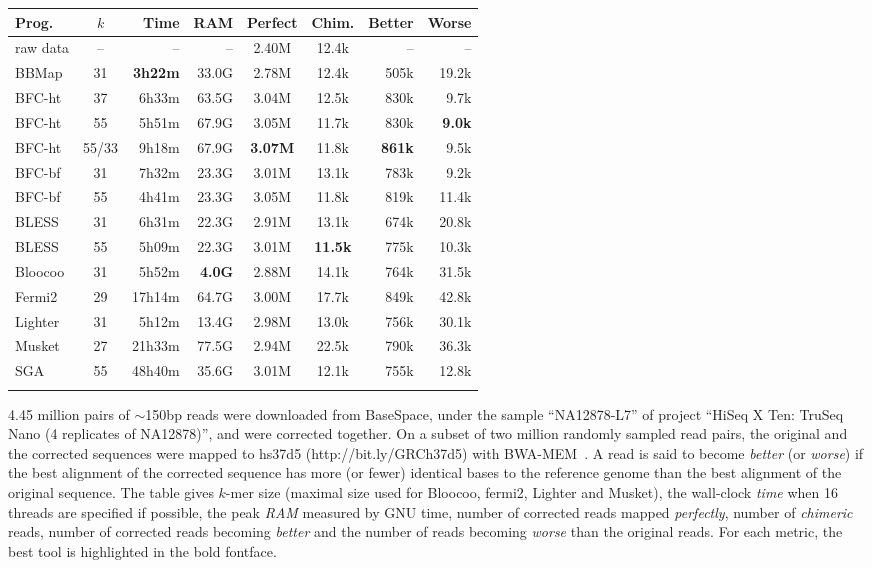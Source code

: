 \documentclass{bioinfo}
\begin{document}
\begin{table}[t]
{\footnotesize
\begin{tabular}{lcrrccrr}
\toprule
Prog.     & $k$ & Time  & RAM   & Perfect&Chim.& Better & Worse \\
\midrule
raw data  & --  & --    & --    & 2.40M  & 12.4k  & --     & -- \\
BBMap     & 31  &{\bf 3h22m}&33.0G& 2.78M& 12.4k  & 505k   & 19.2k \\
BFC-ht    & 37  & 6h33m & 63.5G & 3.04M  & 12.5k  & 830k   & 9.7k \\
BFC-ht    & 55  & 5h51m & 67.9G & 3.05M  &11.7k& 830k   &{\bf 9.0k}\\
BFC-ht    &55/33& 9h18m & 67.9G &{\bf 3.07M}&11.8k&{\bf 861k}&9.5k\\
BFC-bf    & 31  & 7h32m & 23.3G & 3.01M  & 13.1k  & 783k   & 9.2k \\
BFC-bf    & 55  & 4h41m & 23.3G & 3.05M  &11.8k& 819k   & 11.4k \\
BLESS     & 31  & 6h31m & 22.3G & 2.91M  & 13.1k  & 674k   & 20.8k \\
BLESS     & 55  & 5h09m & 22.3G & 3.01M  &{\bf 11.5k}& 775k& 10.3k \\
Bloocoo   & 31  & 5h52m &{\bf 4.0G}&2.88M& 14.1k  & 764k   & 31.5k  \\
Fermi2    & 29  &17h14m & 64.7G & 3.00M  & 17.7k  & 849k   &42.8k \\
Lighter   & 31  & 5h12m & 13.4G & 2.98M  & 13.0k  & 756k   & 30.1k  \\
Musket    & 27  &21h33m & 77.5G & 2.94M  & 22.5k  & 790k   & 36.3k  \\
SGA       & 55  &48h40m & 35.6G & 3.01M  & 12.1k  & 755k   & 12.8k  \\
\botrule
\end{tabular}}{4.45 million pairs of $\sim$150bp reads were downloaded from
BaseSpace, under the sample ``NA12878-L7'' of project ``HiSeq X Ten: TruSeq
Nano (4 replicates of NA12878)'', and were corrected together. On a subset of
two million randomly sampled read pairs, the original and the corrected
sequences were mapped to hs37d5 (http://bit.ly/GRCh37d5) with
BWA-MEM~\citep{Li:2013aa}.  A read is said to become \emph{better} (or
\emph{worse}) if the best alignment of the corrected sequence has more (or
fewer) identical bases to the reference genome than the best alignment of the
original sequence. The table gives $k$-mer size (maximal size used for Bloocoo,
fermi2, Lighter and Musket), the wall-clock \emph{time} when 16 threads are
specified if possible, the peak \emph{RAM} measured by GNU time, number of
corrected reads mapped \emph{perfectly}, number of \emph{chimeric} reads,
number of corrected reads becoming \emph{better} and the number of reads
becoming \emph{worse} than the original reads. For each metric, the best tool
is highlighted in the bold fontface.}
\end{table}
\end{document}
